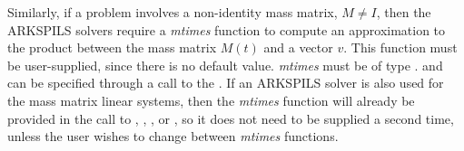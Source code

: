 \documentclass[letterpaper,10pt,english]{sphinxmanual}
\begin{document}
Similarly, if a problem involves a non-identity mass matrix,
\(M\ne I\), then the ARKSPILS solvers require a \emph{mtimes} function
to compute an approximation to the product between the mass matrix
\(M(t)\) and a vector \(v\).  This function must be
user-supplied, since there is no default value.  \emph{mtimes} must be
of type {\hyperref[c_interface/User_supplied:c.ARKSpilsMassTimesVecFn]{\emph{}}}.  and can be specified
through a call to the  {\hyperref[c_interface/User_callable:c.ARKSpilsSetMassTimesVecFn]{\emph{}}}.
If an ARKSPILS solver is also used for the mass matrix linear systems,
then the \emph{mtimes} function will already be provided in the call to
{\hyperref[c_interface/User_callable:c.ARKMassSpgmr]{\emph{}}}, {\hyperref[c_interface/User_callable:c.ARKMassSpbcg]{\emph{}}},
{\hyperref[c_interface/User_callable:c.ARKMassSptfqmr]{\emph{}}}, {\hyperref[c_interface/User_callable:c.ARKMassPcg]{\emph{}}} or
{\hyperref[c_interface/User_callable:c.ARKMassSpfgmr]{\emph{}}}, so it does not need to be supplied a second
time, unless the user wishes to change between \emph{mtimes} functions.
\end{document}
